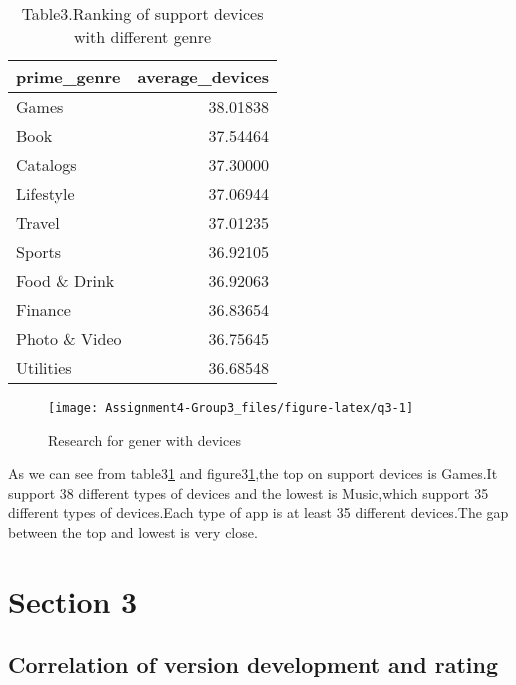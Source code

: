 \documentclass[
]{article}
\begin{document}
\begin{table}[!h]

\caption{\label{tab:q3}Table3.Ranking of support devices with different genre}
\centering
\begin{tabular}[t]{l|r}
\hline
prime\_genre & average\_devices\\
\hline
\rowcolor{gray!6}  Games & 38.01838\\
\hline
Book & 37.54464\\
\hline
\rowcolor{gray!6}  Catalogs & 37.30000\\
\hline
Lifestyle & 37.06944\\
\hline
\rowcolor{gray!6}  Travel & 37.01235\\
\hline
Sports & 36.92105\\
\hline
\rowcolor{gray!6}  Food \& Drink & 36.92063\\
\hline
Finance & 36.83654\\
\hline
\rowcolor{gray!6}  Photo \& Video & 36.75645\\
\hline
Utilities & 36.68548\\
\hline
\end{tabular}
\end{table}

\begin{figure}

{\centering \texttt{[image: Assignment4-Group3\_files/figure-latex/q3-1]} 

}

\caption{Research for gener with devices}\label{fig:q3}
\end{figure}

As we can see from table3\ref{tab:q3} and figure3\ref{fig:q3},the top on support devices is Games.It support 38 different types of devices and the lowest is Music,which support 35 different types of devices.Each type of app is at least 35 different devices.The gap between the top and lowest is very close.

\hypertarget{section-3}{%
\section{Section 3}\label{section-3}}

\hypertarget{correlation-of-version-development-and-rating}{%
\subsection{Correlation of version development and rating}\label{correlation-of-version-development-and-rating}}
\end{document}
